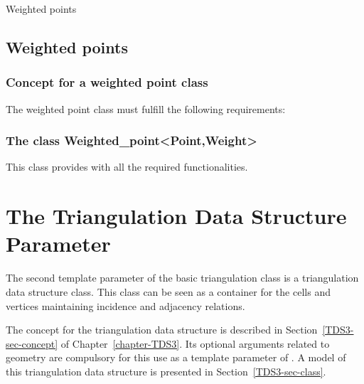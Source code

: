 		\begin{ccClass}{Weighted points}
		\subsection{Weighted points}	
		\label{Triangulation3-sec-class-Weightedpoints}

		\subsubsection{Concept for a weighted point class}

The weighted point class must fulfill the following requirements:

\ccTypes
{}
\ccGlue
{}
\ccGlue
{}

\ccCreation
{}


\ccAccessFunctions
{}

		\subsubsection{The class Weighted\_point<Point,Weight>}

This class provides 
with all the required functionalities.



		\end{ccClass}

\section{The Triangulation Data Structure Parameter}
\label{Triangulation3-sec-tds}

The second template parameter of the basic triangulation class
 is a triangulation data structure
class.  This class can be seen as a container for the cells and
vertices maintaining incidence and adjacency relations. 

The concept for the triangulation data structure is described in
Section~\ref{TDS3-sec-concept} of Chapter~\ref{chapter-TDS3}. Its optional 
arguments related to geometry are compulsory for this use as a
template parameter of .
A model of this triangulation data structure is
 presented in
Section~\ref{TDS3-sec-class}. 
